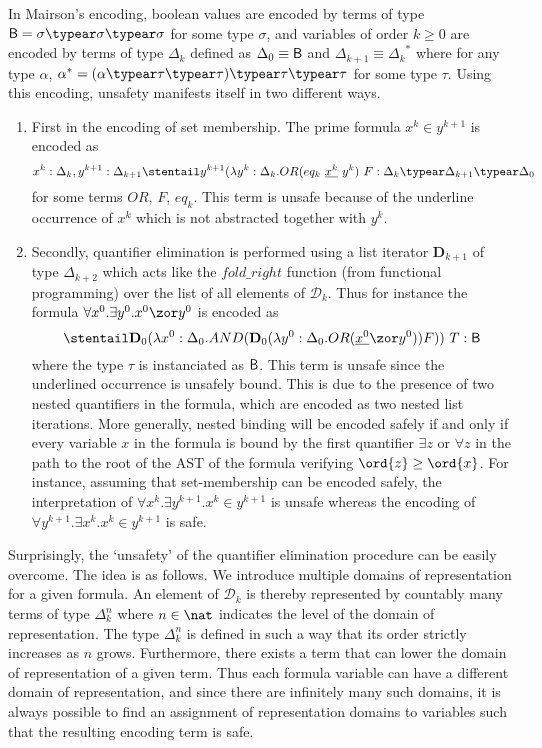 In Mairson's encoding, boolean values are encoded by terms of type
$\booltype = \sigma \typear \sigma\typear \sigma$ for some type
$\sigma$, and variables of order $k \geq 0$ are encoded by terms of
type $\Delta_k$ defined as $\Delta_0 \equiv \mathsf{B}$ and
$\Delta_{k+1} \equiv {\Delta_k}^*$ where for any type $\alpha$,
$\alpha^* = (\alpha \typear \tau \typear \tau)\typear \tau \typear
\tau$ for some type $\tau$. Using this encoding, unsafety manifests
itself in two different ways.
\begin{enumerate}[1.]
  \item
        First in the encoding of set membership. The prime formula $x^k \in y^{k+1}$ is encoded as \begin{equation} x^k : \Delta_k, y^{k+1}:\Delta_{k+1} \stentail y^{k+1} (\lambda y^k : \Delta_k . OR (eq_k~\underline{x^k}~y^k)~F : \Delta_k \typear \Delta_{k+1} \typear \Delta_0 \label{eqn:setmembership}\end{equation}
for some terms $OR$, $F$, $eq_k$.
This term is unsafe because of the underline occurrence of $x^k$ which is not abstracted together with $y^k$.

\item Secondly, quantifier elimination is performed using a list iterator $\mathbf{D}_{k+1}$ of type $\Delta_{k+2}$ which acts like the $fold\_right$ function (from functional programming) over the list of all elements of $\mathcal{D}_k$.
Thus for instance the formula $\forall x^0 . \exists y^0 . x^0
\zor y^0$ is encoded as $$\stentail \mathbf{D}_0 (\lambda
x^0:\Delta_0. AND (\mathbf{D}_0 (\lambda y^0:\Delta_0. OR
(\underline{x^0} \zor y^0)) F))\ T : \booltype$$ where the type
$\tau$ is instanciated as $\mathsf{B}$. This term is unsafe since
the underlined occurrence is unsafely bound. This is due to the
presence of two nested quantifiers in the formula, which are
encoded as two nested list iterations. More generally, nested
binding will be encoded safely if and only if every variable $x$
in the formula is bound by the first quantifier $\exists z$ or
$\forall z$ in the path to the root of the AST of the formula
verifying $\ord{z} \geq \ord{x}$. For instance, assuming that set-membership
can be encoded safely, the interpretation of $\forall x^k
. \exists y^{k+1} . x^k \in y^{k+1}$ is unsafe whereas the
encoding of $\forall y^{k+1} . \exists x^k . x^k \in y^{k+1}$
is safe.
\end{enumerate}

Surprisingly, the `unsafety' of the quantifier elimination procedure can be easily overcome. The idea is as follows. We introduce multiple domains of representation for a given formula. An element of $\mathcal{D}_k$ is thereby represented by countably many terms of type $\Delta_k^n$ where $n\in\nat$ indicates the level of the domain of representation. The type $\Delta_k^n$ is defined in such a way that its order strictly increases as $n$ grows. Furthermore, there exists a term that can lower the domain of representation of a given term. Thus each formula variable can have a different domain of representation, and since there are infinitely many such domains, it is always possible to find an assignment of representation domains to variables such that the resulting encoding term is safe.

